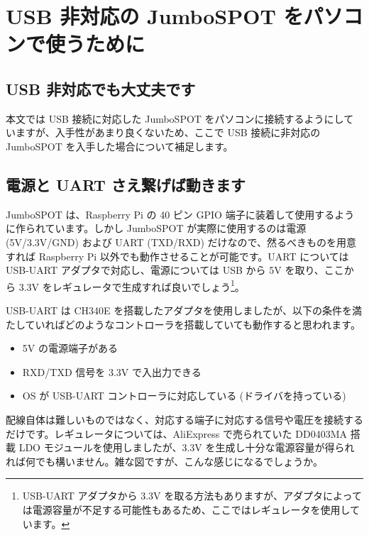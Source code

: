 \documentclass[a4j,oneside]{ujbook}
\begin{document}
\chapter{USB 非対応の JumboSPOT をパソコンで使うために}

\section{USB 非対応でも大丈夫です}

本文では USB 接続に対応した JumboSPOT をパソコンに接続するようにしていますが、入手性があまり良くないため、ここで USB 接続に非対応の JumboSPOT を入手した場合について補足します。

\section{電源と UART さえ繋げば動きます}

JumboSPOT は、Raspberry Pi の 40 ピン GPIO 端子に装着して使用するように作られています。しかし JumboSPOT が実際に使用するのは電源 (5V/3.3V/GND) および UART (TXD/RXD) だけなので、然るべきものを用意すれば Raspberry Pi 以外でも動作させることが可能です。UART については USB-UART アダプタで対応し、電源については USB から 5V を取り、ここから 3.3V をレギュレータで生成すれば良いでしょう\footnote{USB-UART アダプタから 3.3V を取る方法もありますが、アダプタによっては電源容量が不足する可能性もあるため、ここではレギュレータを使用しています。}。

USB-UART は CH340E を搭載したアダプタを使用しましたが、以下の条件を満たしていればどのようなコントローラを搭載していても動作すると思われます。

\begin{itemize}
 \item 5V の電源端子がある
 \item RXD/TXD 信号を 3.3V で入出力できる
 \item OS が USB-UART コントローラに対応している (ドライバを持っている)
\end{itemize}

配線自体は難しいものではなく、対応する端子に対応する信号や電圧を接続するだけです。レギュレータについては、AliExpress で売られていた DD0403MA 搭載 LDO モジュールを使用しましたが、3.3V を生成し十分な電源容量が得られれば何でも構いません。雑な図ですが、こんな感じになるでしょうか。
\end{document}
